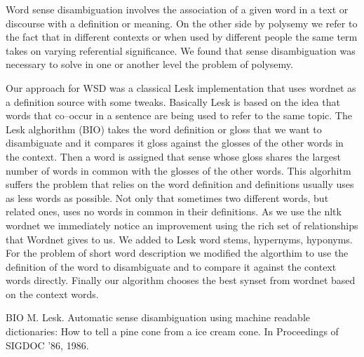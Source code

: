 Word sense disambiguation involves the association of a given word in a text or discourse with a definition or meaning.
On the other side by polysemy we refer to the fact that in different contexts or when used by different people the same term takes on varying referential significance.
We found that sense disambiguation was necessary to solve in one or another level the problem of polysemy.


Our approach for WSD was a classical Lesk implementation that uses wordnet as a definition source with some tweaks.
Basically Lesk is based on the idea that words that co–occur in a sentence are being used to refer to the same topic.
The Lesk alghorithm (BIO) takes the word definition or gloss that we want to disambiguate and it compares it gloss against the glosses of the other words in the context.
Then a word is assigned that sense whose gloss shares the largest number of words in common with the glosses of the other words.
This algorhitm suffers the problem that relies on the word definition and definitions usually uses as less words as possible.
Not only that sometimes two different words, but related ones, uses no words in common in their definitions.
As we use the nltk wordnet we immediately notice an improvement using the rich set of relationships that Wordnet gives to us.
We added to Lesk word stems, hypernyms, hyponyms.
For the problem of short word description we modified the algorthim to use the definition of the word to disambiguate and to compare it against the context words directly.
Finally our algorithm chooses the best synset from wordnet based on the context words.

BIO
M. Lesk. Automatic sense disambiguation using machine readable dictionaries: How to tell a pine cone from a ice cream cone. In Proceedings of SIGDOC ’86, 1986.
